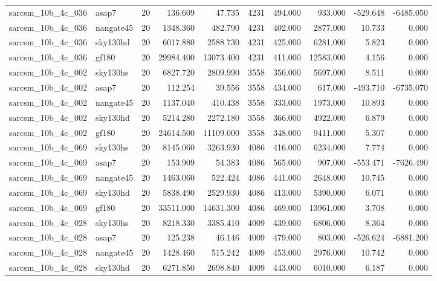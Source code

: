 \documentclass{article}
\begin{document}
\begin{longtable}{llrrrrrrrr}
sarcsm\_10b\_4c\_036 & asap7 & 20 & 136.609 & 47.735 & 4231 & 494.000 & 933.000 & -529.648 & -6485.050 \\
sarcsm\_10b\_4c\_036 & nangate45 & 20 & 1348.360 & 482.790 & 4231 & 402.000 & 2877.000 & 10.733 & 0.000 \\
sarcsm\_10b\_4c\_036 & sky130hd & 20 & 6017.880 & 2588.730 & 4231 & 425.000 & 6281.000 & 5.823 & 0.000 \\
sarcsm\_10b\_4c\_036 & gf180 & 20 & 29984.400 & 13073.400 & 4231 & 411.000 & 12583.000 & 4.156 & 0.000 \\
sarcsm\_10b\_4c\_002 & sky130hs & 20 & 6827.720 & 2809.990 & 3558 & 356.000 & 5697.000 & 8.511 & 0.000 \\
sarcsm\_10b\_4c\_002 & asap7 & 20 & 112.254 & 39.556 & 3558 & 434.000 & 617.000 & -493.710 & -6735.070 \\
sarcsm\_10b\_4c\_002 & nangate45 & 20 & 1137.040 & 410.438 & 3558 & 333.000 & 1973.000 & 10.893 & 0.000 \\
sarcsm\_10b\_4c\_002 & sky130hd & 20 & 5214.280 & 2272.180 & 3558 & 366.000 & 4922.000 & 6.879 & 0.000 \\
sarcsm\_10b\_4c\_002 & gf180 & 20 & 24614.500 & 11109.000 & 3558 & 348.000 & 9411.000 & 5.307 & 0.000 \\
sarcsm\_10b\_4c\_069 & sky130hs & 20 & 8145.060 & 3263.930 & 4086 & 416.000 & 6234.000 & 7.774 & 0.000 \\
sarcsm\_10b\_4c\_069 & asap7 & 20 & 153.909 & 54.383 & 4086 & 565.000 & 907.000 & -553.471 & -7626.490 \\
sarcsm\_10b\_4c\_069 & nangate45 & 20 & 1463.060 & 522.424 & 4086 & 441.000 & 2648.000 & 10.745 & 0.000 \\
sarcsm\_10b\_4c\_069 & sky130hd & 20 & 5838.490 & 2529.930 & 4086 & 413.000 & 5390.000 & 6.071 & 0.000 \\
sarcsm\_10b\_4c\_069 & gf180 & 20 & 33511.000 & 14631.300 & 4086 & 469.000 & 13961.000 & 3.708 & 0.000 \\
sarcsm\_10b\_4c\_028 & sky130hs & 20 & 8218.330 & 3385.410 & 4009 & 439.000 & 6806.000 & 8.364 & 0.000 \\
sarcsm\_10b\_4c\_028 & asap7 & 20 & 125.238 & 46.146 & 4009 & 479.000 & 803.000 & -526.624 & -6881.200 \\
sarcsm\_10b\_4c\_028 & nangate45 & 20 & 1428.460 & 515.242 & 4009 & 453.000 & 2976.000 & 10.742 & 0.000 \\
sarcsm\_10b\_4c\_028 & sky130hd & 20 & 6271.850 & 2698.840 & 4009 & 443.000 & 6010.000 & 6.187 & 0.000 \\

\end{longtable}
\end{document}
